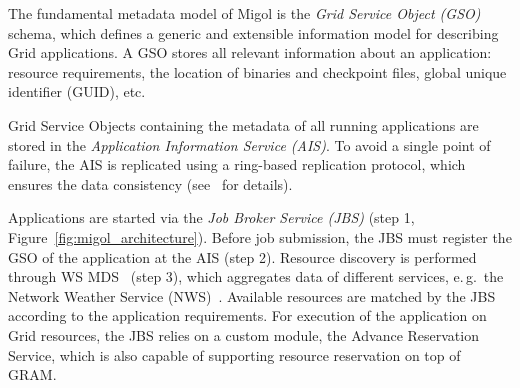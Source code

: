 \documentclass{rspublic}
\begin{document}
The fundamental metadata model of Migol is the \emph{Grid Service
  Object (GSO)} schema, which defines a generic and extensible
information model for describing Grid applications.
A GSO stores all relevant information about an application: resource
requirements, the location of binaries and checkpoint files, global
unique identifier (GUID), etc.

Grid Service Objects containing the metadata of all running
applications are stored in the {\em Application Information Service
  (AIS)}.
To avoid a single point of failure, the AIS is replicated using a ring-based
replication protocol, which ensures the data consistency
(see~\cite{Luckow:2008ys} for details).

Applications are started via the {\em Job Broker Service (JBS)}
(step 1, Figure~\ref{fig:migol_architecture}). Before job
submission, the JBS must register the GSO of the application at the
AIS (step 2).  Resource discovery is performed through WS
MDS~\cite{schopf06}  (step 3), which aggregates data of different services,
e.\,g.\ the Network Weather Service (NWS)~\cite{NWS99}.
Available resources are matched by the JBS according to the
application requirements. For execution of the application on
Grid resources, the JBS relies on a custom module, the Advance
Reservation Service, which is also capable of supporting resource reservation
on top of GRAM.

             
\end{document}
